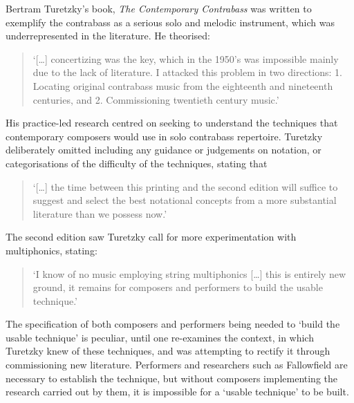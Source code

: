Bertram Turetzky’s book, \emph{The Contemporary Contrabass} was written to exemplify the contrabass as a serious solo and melodic instrument, which was underrepresented in the literature. He theorised: 
\begin{quote}
    ‘[…] concertizing was the key, which in the 1950’s was impossible mainly due to the lack of literature. I attacked this problem in two directions: 1. Locating original contrabass music from the eighteenth and nineteenth centuries, and 2. Commissioning twentieth century music.’\autocite[vii]{turetzkyContemporaryContrabass1974}
\end{quote}
His practice-led research centred on seeking to understand the techniques that contemporary composers would use in solo contrabass repertoire. Turetzky deliberately omitted including any guidance or judgements on notation, or categorisations of the difficulty of the techniques, stating that \begin{quote}
    ‘[…] the time between this printing and the second edition will suffice to suggest and select the best notational concepts from a more substantial literature than we possess now.’\autocite{turetzkyContemporaryContrabass1974} 
\end{quote}The second edition saw Turetzky call for more experimentation with multiphonics, stating:
\begin{quote}
    ‘I know of no music employing string multiphonics […] this is entirely new ground, it remains for composers and performers to build the usable technique.’\autocite[138]{turetzkyContemporaryContrabass1992}
\end{quote}
The specification of both composers and performers being needed to ‘build the usable technique’ is peculiar, until one re-examines the context, in which Turetzky knew of these techniques, and was attempting to rectify it through commissioning new literature. Performers and researchers such as Fallowfield are necessary to establish the technique, but without composers implementing the research carried out by them, it is impossible for a ‘usable technique’ to be built.

